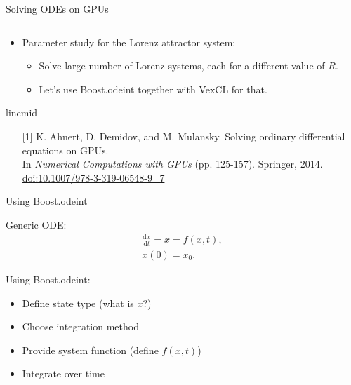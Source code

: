 \documentclass[@BEAMER_OPTIONS@]{beamer}
\newcommand{\footnoteline}{\begin{beamercolorbox}[wd=\textwidth,ht=.1ex,dp=0ex]{linemid}\end{beamercolorbox}}
\begin{document}
\begin{frame}{Solving ODEs on GPUs}
\begin{columns}
\begin{column}{0.4\textwidth}
        \end{column}
    \end{columns}
    \begin{itemize}
        \item Parameter study for the Lorenz attractor system:
            \begin{itemize}
                \item Solve large number of Lorenz systems, each
                    for a different value of $R$.
                \item Let's use Boost.odeint together with VexCL
                    for that.
            \end{itemize}
    \end{itemize}
    \footnoteline
    \begin{footnotesize}
        \begin{itemize}
            \item[{[1]}] K. Ahnert, D. Demidov, and M. Mulansky.  Solving
                ordinary differential equations on GPUs.\\
                In \emph{Numerical Computations with GPUs} (pp. 125-157).
                Springer, 2014.
                \href{http://dx.doi.org/10.1007/978-3-319-06548-9\_7}{doi:10.1007/978-3-319-06548-9\_7}
        \end{itemize}
    \end{footnotesize}
\end{frame}

\begin{frame}{Using Boost.odeint}
    \begin{block}{Generic ODE:}
        \begin{gather*}
            \frac{\mbox{d} x}{\mbox{d} t } = \dot{x} = f(x , t),\\
             x(0) = x_0.
        \end{gather*}
    \end{block}

    \vspace{\baselineskip}

    \begin{exampleblock}{Using Boost.odeint:}
        \begin{itemize}
            \item Define state type (what is $x$?)
            \item Choose integration method
            \item Provide system function (define $f(x,t)$)
            \item Integrate over time
        \end{itemize}
    \end{exampleblock}
\end{frame}
\end{document}
